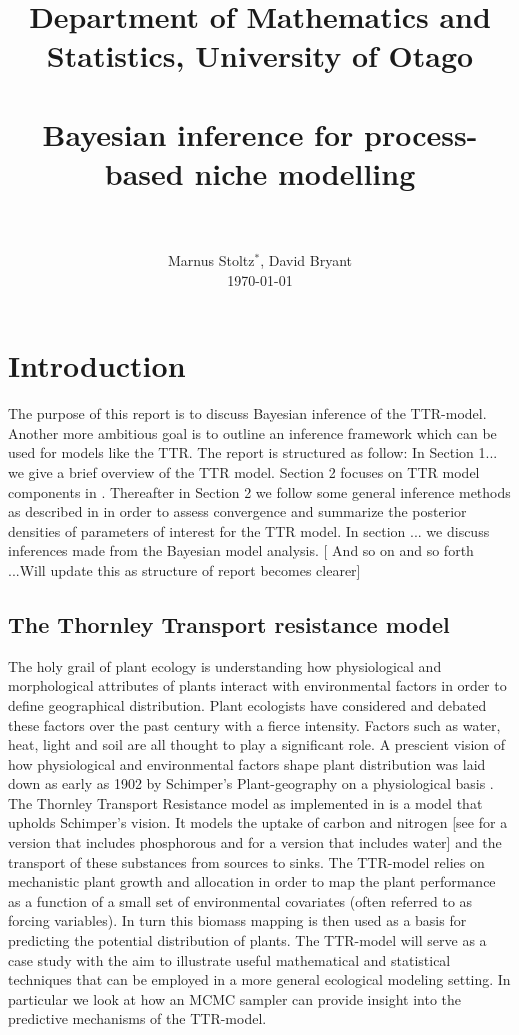 \documentclass[paper=a4, fontsize=11pt]{scrartcl}
\title{
		\usefont{OT1}{bch}{b}{n}
		\normalfont \normalsize Department of Mathematics and Statistics, University of Otago  \\ [25pt]
		\horrule{0.5pt} \\[0.4cm]
		\huge Bayesian inference for process-based niche modelling \\
		\horrule{2pt} \\[0.5cm]
}
\author{
		\normalfont 								\normalsize
        Marnus Stoltz$^*$, David Bryant  \\[-3pt]		\normalsize
        \today
}
\date{}
\numberwithin{equation}{section}		%
\numberwithin{figure}{section}			%
\numberwithin{table}{section}				%
\begin{document}
\maketitle
\section{Introduction}

The purpose of this report is to discuss Bayesian inference of the TTR-model. Another more ambitious goal is to outline an inference framework which can be used for models like the TTR. The report is structured as follow: In Section 1... we give a brief overview of the TTR model. Section 2 focuses on TTR model components in  . Thereafter in Section 2 we follow some general inference methods as described in \cite{GelmanBayesianAnalysis} in order to assess convergence and summarize the posterior densities of parameters of interest for the TTR model. In section ... we discuss inferences made from the Bayesian model analysis. [ And so on and so forth ...Will update this as structure of report becomes clearer]  

\subsection{The Thornley Transport resistance model}

The holy grail of plant ecology is understanding how physiological and morphological attributes of plants interact with environmental factors in order to define geographical distribution. Plant ecologists have considered  and debated these factors over the past century with a fierce intensity. Factors such as water, heat, light and soil are all thought to play a significant role. A prescient vision of how physiological and environmental factors shape plant distribution was laid down as early as 1902 by Schimper's Plant-geography on a physiological basis \cite{Schimper1902Plant-geographyBasis.} . 
The Thornley Transport Resistance model as implemented in \cite{Higgins2012APlants} is a model that upholds Schimper's vision. It models the uptake of carbon and nitrogen [see \cite{Dormann2012CorrelationDichotomy} for a version that includes phosphorous and \cite{Thornley1995Shoot:Models} for a version that includes water] and the transport of these substances from sources to sinks. The TTR-model relies on mechanistic plant growth and allocation in order to map the plant performance as a function of a small set of environmental covariates (often referred to as forcing variables). In turn this biomass mapping is then used as a basis for predicting the potential distribution of plants. 
The TTR-model will serve as a case study with the aim to illustrate useful mathematical and statistical techniques that can be employed in a more general ecological modeling setting. In particular we look at how an MCMC sampler \cite{Christen2010AT-walk} can provide insight into the predictive mechanisms of the TTR-model.
\end{document}
